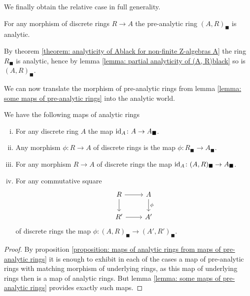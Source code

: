 We finally obtain the relative case in full generality.
\begin{corollary}
	\label{corollary: analyticity of (A, R)black}
	
	For any morphism of discrete rings $R\to A$ the pre-analytic ring $(A, R)_\blacksquare$ is analytic.
\end{corollary}
\begin{shortproof}
	By theorem \ref{theorem: analyticity of Ablack for non-finite Z-algebras A} the ring $R_\blacksquare$ is analytic, hence by lemma \ref{lemma: partial analyticity of (A, R)black} so is $(A, R)_\blacksquare$.
\end{shortproof}


We can now translate the morphism of pre-analytic rings from lemma \ref{lemma: some maps of pre-analytic rings} into the analytic world.
\begin{corollary}
	\label{corollary: some maps of analytic rings}
	
	We have the following maps of analytic rings
	\begin{enumerate}[(i)]
		\item
		For any discrete ring $A$ the map $\mathrm{id}_A\colon A\to A_\blacksquare$.
		
		\item
		Any morphism $\phi\colon R\to A$ of discrete rings is the map $\phi\colon R_\blacksquare\to A_\blacksquare$.
		
		\item
		For any morphism $R\to A$ of discrete rings the map $\mathrm{id}_A\colon (A, R)_\blacksquare\to A_\blacksquare$.
		
		\item
		For any commutative square
			$$\begin{tikzcd}
				R\ar[r]\ar[d] &A\ar[d, "\phi"]\\
				R'\ar[r] & A'
			\end{tikzcd}$$
		of discrete rings the map $\phi\colon (A, R)_\blacksquare \to (A', R')_\blacksquare$.
	\end{enumerate}
\end{corollary}
\begin{proof}
	By proposition \ref{proposition: maps of analytic rings from maps of pre-analytic rings} it is enough to exhibit in each of the cases a map of pre-analytic rings with matching morphism of underlying rings, as this map of underlying rings then is a map of analytic rings. But lemma \ref{lemma: some maps of pre-analytic rings} provides exactly such maps.
\end{proof}


